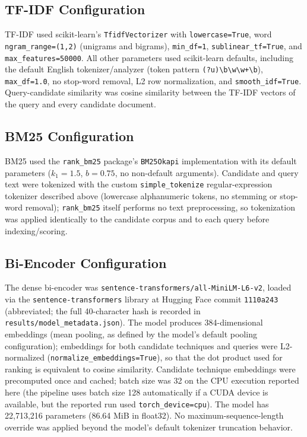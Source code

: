 \documentclass[conference]{IEEEtran}
\begin{document}
\subsection{TF-IDF Configuration}
TF-IDF used scikit-learn's \texttt{TfidfVectorizer} with \texttt{lowercase=True}, word \texttt{ngram\_range=(1,2)} (unigrams and bigrams), \texttt{min\_df=1}, \texttt{sublinear\_tf=True}, and \texttt{max\_features=50000}. All other parameters used scikit-learn defaults, including the default English tokenizer/analyzer (token pattern \texttt{(?u)\textbackslash b\textbackslash w\textbackslash w+\textbackslash b}), \texttt{max\_df=1.0}, no stop-word removal, L2 row normalization, and \texttt{smooth\_idf=True}. Query-candidate similarity was cosine similarity between the TF-IDF vectors of the query and every candidate document.

\subsection{BM25 Configuration}
BM25 used the \texttt{rank\_bm25} package's \texttt{BM25Okapi} implementation \cite{rankbm25} with its default parameters ($k_1=1.5$, $b=0.75$, no non-default arguments). Candidate and query text were tokenized with the custom \texttt{simple\_tokenize} regular-expression tokenizer described above (lowercase alphanumeric tokens, no stemming or stop-word removal); \texttt{rank\_bm25} itself performs no text preprocessing, so tokenization was applied identically to the candidate corpus and to each query before indexing/scoring.

\subsection{Bi-Encoder Configuration}
The dense bi-encoder was \texttt{sentence-transformers/all-MiniLM-L6-v2}, loaded via the \texttt{sentence-transformers} library at Hugging Face commit \texttt{1110a243} (abbreviated; the full 40-character hash is recorded in \texttt{results/model\_metadata.json}). The model produces 384-dimensional embeddings (mean pooling, as defined by the model's default pooling configuration); embeddings for both candidate techniques and queries were L2-normalized (\texttt{normalize\_embeddings=True}), so that the dot product used for ranking is equivalent to cosine similarity. Candidate technique embeddings were precomputed once and cached; batch size was 32 on the CPU execution reported here (the pipeline uses batch size 128 automatically if a CUDA device is available, but the reported run used \texttt{torch\_device=cpu}). The model has 22{,}713{,}216 parameters (86.64 MiB in float32). No maximum-sequence-length override was applied beyond the model's default tokenizer truncation behavior.
\end{document}
